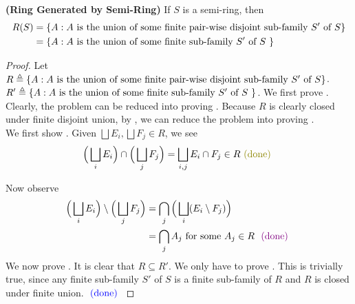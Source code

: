 \documentclass{report}
\begin{document}
\begin{theorem}
\label{RGbS}
\textbf{(Ring Generated by Semi-Ring)} If $S$ is a semi-ring, then 
\begin{align*}
R(S)&=\{ A:A\text{ is the union of some finite pair-wise disjoint sub-family $S'$ of $S $} \}\\
&=\{ A:A\text{ is the union of some finite sub-family $S'$ of $S$ } \}
\end{align*}
\end{theorem}
\begin{proof}
  Let $R\triangleq \{ A:A\text{ is the union of some finite pair-wise disjoint sub-family $S'$ of $S$} \}$. $R'\triangleq \{ A:A\text{ is the union of some finite sub-family $S'$ of $S$ } \}$. We first prove  .\\


  Clearly, the problem can be reduced into proving . Because $R$ is clearly closed under finite disjoint union, by , we can reduce the problem into proving .\\

We first show . Given $\bigsqcup E_i,\bigsqcup F_j \in R$, we see 
\begin{align*}
  \Big(\bigsqcup_i E_i\Big)\cap \Big(\bigsqcup_j F_j\Big)=\bigsqcup_{i,j} E_i\cap F_j \in R \odone
\end{align*}

Now observe
\begin{align*}
\Big(\bigsqcup_i E_i \Big)\setminus \Big(\bigsqcup_j F_j \Big)&=\bigcap_j \Big(\bigsqcup_i (E_i\setminus F_j) \Big)\\
&=\bigcap_j A_j  \text{ for some $A_j \in R$ }\textcolor{violet}{\text{ (done) }}
\end{align*}
We now prove . It is clear that $R\subseteq R'$. We only have to prove  . This is trivially true, since any finite sub-family $S'$ of $S$ is a finite sub-family of $R$ and  $R$ is closed under finite union. $\textcolor{blue}{\text{ (done) }}$
\end{proof}
\end{document}
